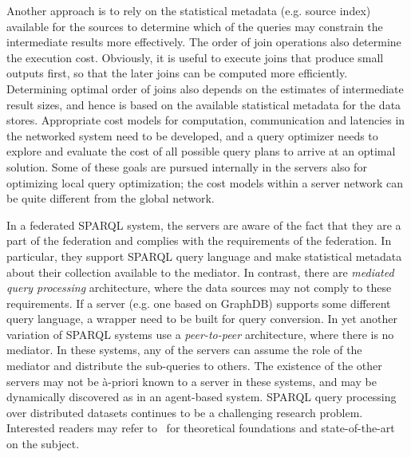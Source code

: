 Another approach is to rely on the statistical metadata (e.g. source index) available for the sources to determine which of the 
queries may constrain the intermediate results more effectively. The order of join operations also determine the execution cost. 
Obviously, it is useful to execute joins that produce small outputs first, so that the later joins can be computed more efficiently. 
Determining optimal order of joins also depends on the estimates of intermediate result sizes, and hence is based on the available 
statistical metadata for the data stores.
Appropriate cost models for computation, communication and latencies in the networked system need to be developed, and a query optimizer 
needs to explore and evaluate the cost of all possible query plans to arrive at an optimal solution. Some of these goals are pursued 
internally in the servers also for optimizing local query optimization; the cost models within a server network can be quite different 
from the global network. 

 
In a federated SPARQL system, the servers are aware of the fact that they are a part of the federation and complies with the requirements
of the federation. In particular, they support SPARQL query language and make statistical metadata about their collection available to
the mediator. In contrast, there are {\em mediated query processing} architecture, where the data sources may not comply to these 
requirements.  If a server (e.g. one based on GraphDB) supports some different query language, a wrapper need to be built for query 
conversion. 
In yet another variation of SPARQL systems use a {\em peer-to-peer} architecture, where there is no mediator. In these systems, any of 
the servers can assume the role of the mediator and distribute the sub-queries to others. The existence of the other servers may not be 
\`{a}-priori known to a server in these systems, and may be dynamically discovered as in an agent-based system.
%
SPARQL query processing over distributed datasets continues to be a challenging research problem. Interested readers may refer 
to~\citep{Hose:2011,Wylot:2018} for theoretical foundations and state-of-the-art on the subject.
